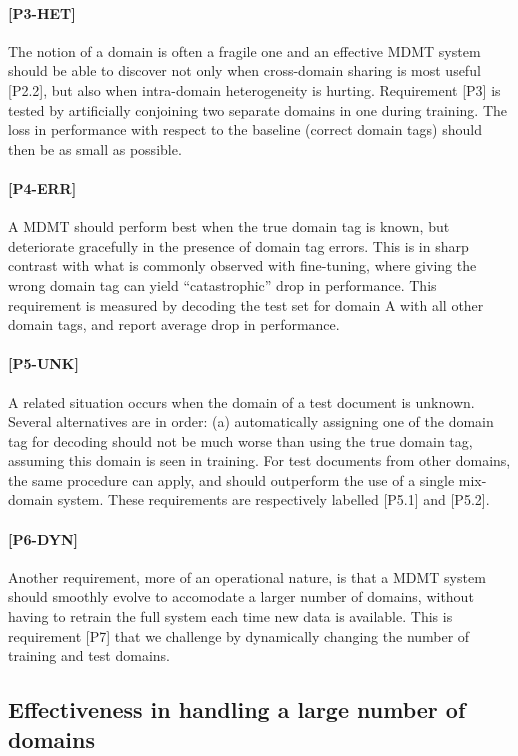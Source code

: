 \documentclass[11pt]{article}
\newcommand{\fyTodo}[1]{\Todo[FY:]{\textcolor{orange}{#1}}}
\begin{document}
\paragraph{[P3-HET]}
The notion of a domain is often a fragile one and an effective MDMT system should be able to discover not only when cross-domain sharing is most useful [P2.2], but also when intra-domain heterogeneity is hurting. Requirement [P3] is tested by artificially conjoining two separate domains in one during training. The loss in performance with respect to the baseline (correct domain tags) should then be as small as possible.

\paragraph{[P4-ERR]}
A MDMT should perform best when the true domain tag is known, but deteriorate gracefully in the presence of domain tag errors. This is in sharp contrast with what is commonly observed with fine-tuning, where giving the wrong domain tag can yield ``catastrophic'' drop in performance. This requirement is measured by decoding the test set for domain A with all other domain tags, and report average drop in performance.

\paragraph{[P5-UNK]}
A related situation occurs when the domain of a test document is unknown. Several alternatives are in order: (a) automatically assigning one of the domain tag for decoding should not be much worse than using the true domain tag, assuming this domain is seen in training. For test documents from other domains, the same procedure can apply, and should outperform the use of a single mix-domain system. These requirements are respectively labelled [P5.1] and [P5.2]\fyTodo{Not so sure of these ones}.

\paragraph{[P6-DYN]}
Another requirement, more of an operational nature, is that a MDMT system should smoothly evolve to accomodate a larger number of domains, without having to retrain the full system each time new data is available. This is requirement [P7] that we challenge by dynamically changing the number of training and test domains.

\subsection{Effectiveness in handling a large number of domains \label{ssec:scaling}}
\end{document}
